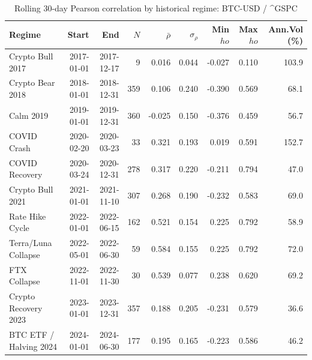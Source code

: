 \begin{table}[H]
\centering
\small
\caption{Rolling 30-day Pearson correlation by historical regime: BTC-USD / ^GSPC}
\label{tab:regime_corr_BTCUSDGSPC}
\begin{tabular}{lrrrrrrrr}
\toprule
Regime & Start & End & $N$ & $\bar{\rho}$ & $\sigma_\rho$ & Min $
ho$ & Max $
ho$ & Ann.Vol (\%) \\
\midrule
Crypto Bull 2017 & 2017-01-01 & 2017-12-17 & 9 & 0.016 & 0.044 & -0.027 & 0.110 & 103.9 \\
Crypto Bear 2018 & 2018-01-01 & 2018-12-31 & 359 & 0.106 & 0.240 & -0.390 & 0.569 & 68.1 \\
Calm 2019 & 2019-01-01 & 2019-12-31 & 360 & -0.025 & 0.150 & -0.376 & 0.459 & 56.7 \\
COVID Crash & 2020-02-20 & 2020-03-23 & 33 & 0.321 & 0.193 & 0.019 & 0.591 & 152.7 \\
COVID Recovery & 2020-03-24 & 2020-12-31 & 278 & 0.317 & 0.220 & -0.211 & 0.794 & 47.0 \\
Crypto Bull 2021 & 2021-01-01 & 2021-11-10 & 307 & 0.268 & 0.190 & -0.232 & 0.583 & 69.0 \\
Rate Hike Cycle & 2022-01-01 & 2022-06-15 & 162 & 0.521 & 0.154 & 0.225 & 0.792 & 58.9 \\
Terra/Luna Collapse & 2022-05-01 & 2022-06-30 & 59 & 0.584 & 0.155 & 0.225 & 0.792 & 72.0 \\
FTX Collapse & 2022-11-01 & 2022-11-30 & 30 & 0.539 & 0.077 & 0.238 & 0.620 & 69.2 \\
Crypto Recovery 2023 & 2023-01-01 & 2023-12-31 & 357 & 0.188 & 0.205 & -0.231 & 0.579 & 36.6 \\
BTC ETF / Halving 2024 & 2024-01-01 & 2024-06-30 & 177 & 0.195 & 0.165 & -0.223 & 0.586 & 46.2 \\
\bottomrule
\end{tabular}
\end{table}